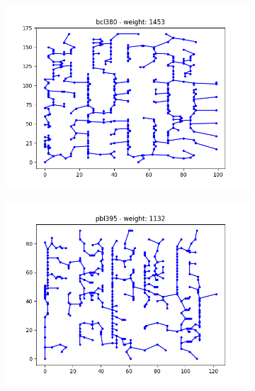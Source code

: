 \documentclass{article}
\def\v{0.4}
\begin{document}
\begin{figure}[h!]
\begin{subfigure}[b]{\v\linewidth}
		\includegraphics[width=\linewidth]{graphs/MST_bcl380.png}
	\end{subfigure}
	\begin{subfigure}[b]{\v\linewidth}
		\includegraphics[width=\linewidth]{graphs/MST_pbl395.png}
	\end{subfigure}
\end{figure}
\end{document}
